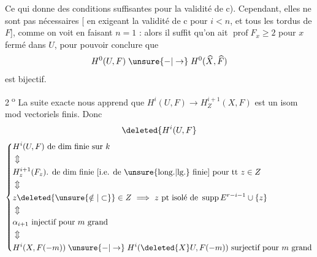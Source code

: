 Ce qui donne des conditions suffisantes pour la validité de c). Cependant, elles ne sont pas nécessaires [ en exigeant la validité de c pour $i<n$, et tous les tordus de $F$], comme on voit en faisant $n=1$ : alors il suffit qu'on ait $\operatorname{prof} F_x\geq2$ pour $x$ fermé dans $U$, pour pouvoir conclure que
\[
H^0(U,F)\mathrel{\unsure{-|\to}}H^0(\widehat X,\widehat F)
\]
est bijectif.

\textcircled{\scriptsize 2\textsuperscript{o}} La suite exacte nous apprend que  $H^i(U,F)\to H^{i+1}_Z(X,F)$ est un isom mod vectoriels finis. Donc
\[
\deleted{H^i(U,F}
\]
\[
\left\{\begin{aligned}
&H^i(U,F)\text{ de dim finie sur }k\\
&\Updownarrow\\
&H^{i+1}_z(F_z)\text{. de dim finie [i.e. de \unsure{long.|lg.} finie] pour tt }z\in Z\\
&\Updownarrow\\
&z\deleted{\unsure{\notin|\subset}}\in Z\ \Longrightarrow\ z\text{ pt isolé de }\operatorname{supp} E^{r-i-1}\cup\{z\}\\
&\Updownarrow\\
&\alpha_{i+1}\text{ injectif pour }m\text{ grand}\\
&\Updownarrow\\
&H^i(X,F(-m))\mathrel{\unsure{-|\to}}H^i(\deleted{X}U,F(-m))\ \text{surjectif pour }m\text{ grand}
\end{aligned}\right.
\]
